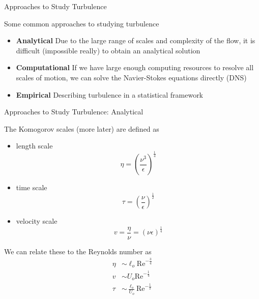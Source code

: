 
\begin{frame}{Approaches to Study Turbulence}
  
  Some common approaches to studying turbulence
  \begin{itemize}
  	\item \textbf{Analytical} \newline Due to the large range of scales and complexity of the flow, it is difficult (impossible really) to obtain an analytical solution
  	\item \textbf{Computational} \newline If we have large enough computing resources to resolve all scales of motion, we can solve the Navier-Stokes equations directly (DNS)
  	\item \textbf{Empirical} \newline Describing turbulence in a statistical framework
  \end{itemize}
\end{frame}


\begin{frame}{Approaches to Study Turbulence: Analytical}
  
  The Komogorov scales (more later) are defined as
  \begin{itemize}
		\item length scale $$\eta = \left(\frac{\nu^3}{\epsilon}\right)^{\frac{1}{4}}$$
		\item time scale $$\tau = \left(\frac{\nu}{\epsilon}\right)^{\frac{1}{2}}$$
		\item velocity scale $$v = \frac{\eta}{\nu} = (\nu \epsilon)^{\frac{1}{4}}$$
	\end{itemize}
	We can relate these to the Reynolds number as
	\begin{align*}
		\eta &\sim \ell_o \text{Re}^{-\frac{3}{4}}\\
		v &\sim U_o \text{Re}^{-\frac{1}{4}}\\
		\tau &\sim \frac{\ell_o}{U_o} \text{Re}^{-\frac{1}{2}}
	\end{align*}
\end{frame}

